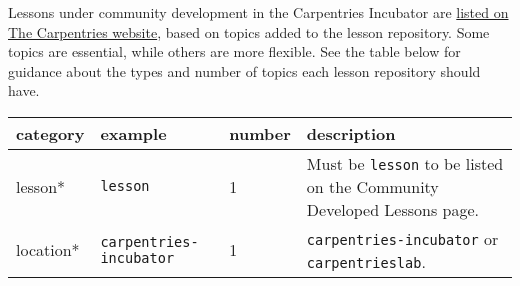 \documentclass[
]{book}
\begin{document}
Lessons under community development in the Carpentries Incubator are
\href{https://carpentries.org/community-lessons/}{listed on The Carpentries website},
based on topics added to the lesson repository.
Some topics are essential, while others are more flexible.
See the table below for guidance about the types and number of topics each
lesson repository should have.

\begin{longtable}[]{@{}llll@{}}
\toprule
\begin{minipage}[b]{0.26\columnwidth}\raggedright
category\strut
\end{minipage} & \begin{minipage}[b]{0.26\columnwidth}\raggedright
example\strut
\end{minipage} & \begin{minipage}[b]{0.21\columnwidth}\raggedright
number\strut
\end{minipage} & \begin{minipage}[b]{0.16\columnwidth}\raggedright
description\strut
\end{minipage}\tabularnewline
\midrule
\endhead
\begin{minipage}[t]{0.26\columnwidth}\raggedright
lesson*\strut
\end{minipage} & \begin{minipage}[t]{0.26\columnwidth}\raggedright
\texttt{lesson}\strut
\end{minipage} & \begin{minipage}[t]{0.21\columnwidth}\raggedright
1\strut
\end{minipage} & \begin{minipage}[t]{0.16\columnwidth}\raggedright
Must be \texttt{lesson} to be listed on the Community Developed Lessons page.\strut
\end{minipage}\tabularnewline
\begin{minipage}[t]{0.26\columnwidth}\raggedright
location*\strut
\end{minipage} & \begin{minipage}[t]{0.26\columnwidth}\raggedright
\texttt{carpentries-incubator}\strut
\end{minipage} & \begin{minipage}[t]{0.21\columnwidth}\raggedright
1\strut
\end{minipage} & \begin{minipage}[t]{0.16\columnwidth}\raggedright
\texttt{carpentries-incubator} or \texttt{carpentrieslab}.\strut
\end{minipage}\tabularnewline

\end{longtable}
\end{document}
